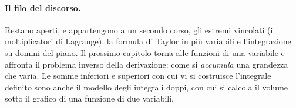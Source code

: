 \paragraph{Il filo del discorso.} Restano aperti, e appartengono a un secondo corso,
gli estremi vincolati (i moltiplicatori di Lagrange), la formula di Taylor in più
variabili e l'integrazione su domini del piano. Il prossimo capitolo torna alle funzioni
di una variabile e affronta il problema inverso della derivazione: come si
\emph{accumula} una grandezza che varia. Le somme inferiori e superiori con cui vi si
costruisce l'integrale definito sono anche il modello degli integrali doppi, con cui si
calcola il volume sotto il grafico di una funzione di due variabili.
